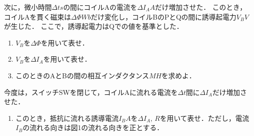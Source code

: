 次に，微小時間$\Delta t\unit{s}$の間にコイルAの電流を$\Delta I_A\unit{A}$だけ増加させた．
このとき，コイルAを貫く磁束は$\Delta\Phi\unit{Wb}$だけ変化し，コイルBのPとQの間に誘導起電力$V_B\unit{V}$が生じた．
ここで，誘導起電力はQでの値を基準とした．

\begin{enumerate}[（1）]
  \setlength{\leftskip}{-1.5zw}
  \setlength{\itemindent}{1zw}\setlength{\labelsep}{0.5zw}
  \setlength{\labelwidth}{1zw}\setlength{\leftmargin}{1zw}
  \setlength{\itemsep}{0.5\baselineskip}
  \setcounter{enumi}{1}
  \item $V_B$を$\Delta\Phi$を用いて表せ．
  \item $V_B$を$\Delta I_A$を用いて表せ．
  \item このときのAとBの間の相互インダクタンス$M\unit{H}$を求めよ．
\end{enumerate}

今度は，スイッチSWを閉じて，コイルAに流れる電流を$\Delta t$間に$\Delta I_A$だけ増加させた．

\begin{enumerate}[（1）]
  \setlength{\leftskip}{-1.5zw}
  \setlength{\itemindent}{1zw}\setlength{\labelsep}{0.5zw}
  \setlength{\labelwidth}{1zw}\setlength{\leftmargin}{1zw}
  \setlength{\itemsep}{0.5\baselineskip}
  \setcounter{enumi}{4}
  \item このとき，抵抗に流れる誘導電流$I_B\unit{A}$を$\Delta I_A,\,R$を用いて表せ．ただし，電流$I_B$の流れる向きは図1の流れる向きを正とする．
\end{enumerate}

